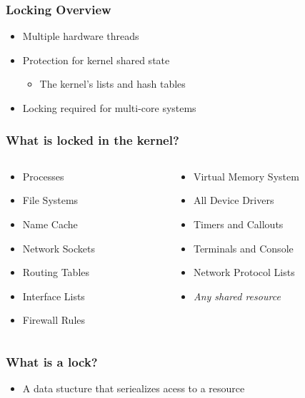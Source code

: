 \documentclass[pdftex]{beamer} %
\begin{document}
\begin{frame}
  \frametitle{Locking Overview}
  \begin{itemize}
  \item Multiple hardware threads
  \item Protection for kernel shared state
    \begin{itemize}
    \item The kernel's lists and hash tables
    \end{itemize}
  \item Locking required for multi-core systems
  \end{itemize}
\end{frame}

\begin{frame}[fragile]
  \frametitle{What is locked in the kernel?}
  \begin{columns}[t]
    \begin{column}{5cm}
      \begin{itemize}
      \item Processes
      \item File Systems
      \item Name Cache
      \item Network Sockets
      \item Routing Tables
      \item Interface Lists
      \item Firewall Rules
      \end{itemize}
    \end{column}
    \begin{column}{5cm}
      \begin{itemize}
      \item Virtual Memory System
      \item All Device Drivers
      \item Timers and Callouts
      \item Terminals and Console
      \item Network Protocol Lists
      \item \emph{Any shared resource}
      \end{itemize}
    \end{column}
  \end{columns}
\end{frame}

\begin{frame}
  \frametitle{What is a lock?}
  \begin{itemize}
  \item A data stucture that seriealizes acess to a resource
  \end{itemize}
\end{frame}
\end{document}
